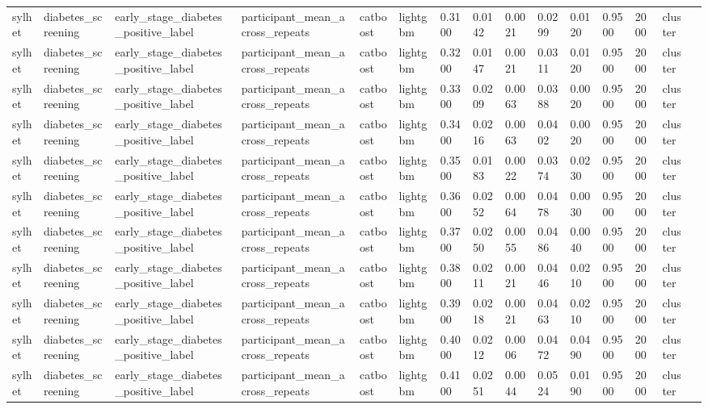 \begin{tabular}{lllllllllllllll}
sylhet & diabetes\_screening & early\_stage\_diabetes\_positive\_label & participant\_mean\_across\_repeats & catboost & lightgbm & 0.3100 & 0.0142 & 0.0021 & 0.0299 & 0.0120 & 0.9500 & 2000 & cluster &  \\
sylhet & diabetes\_screening & early\_stage\_diabetes\_positive\_label & participant\_mean\_across\_repeats & catboost & lightgbm & 0.3200 & 0.0147 & 0.0021 & 0.0311 & 0.0120 & 0.9500 & 2000 & cluster &  \\
sylhet & diabetes\_screening & early\_stage\_diabetes\_positive\_label & participant\_mean\_across\_repeats & catboost & lightgbm & 0.3300 & 0.0209 & 0.0063 & 0.0388 & 0.0020 & 0.9500 & 2000 & cluster &  \\
sylhet & diabetes\_screening & early\_stage\_diabetes\_positive\_label & participant\_mean\_across\_repeats & catboost & lightgbm & 0.3400 & 0.0216 & 0.0063 & 0.0402 & 0.0020 & 0.9500 & 2000 & cluster &  \\
sylhet & diabetes\_screening & early\_stage\_diabetes\_positive\_label & participant\_mean\_across\_repeats & catboost & lightgbm & 0.3500 & 0.0183 & 0.0022 & 0.0374 & 0.0230 & 0.9500 & 2000 & cluster &  \\
sylhet & diabetes\_screening & early\_stage\_diabetes\_positive\_label & participant\_mean\_across\_repeats & catboost & lightgbm & 0.3600 & 0.0252 & 0.0064 & 0.0478 & 0.0030 & 0.9500 & 2000 & cluster &  \\
sylhet & diabetes\_screening & early\_stage\_diabetes\_positive\_label & participant\_mean\_across\_repeats & catboost & lightgbm & 0.3700 & 0.0250 & 0.0055 & 0.0486 & 0.0040 & 0.9500 & 2000 & cluster &  \\
sylhet & diabetes\_screening & early\_stage\_diabetes\_positive\_label & participant\_mean\_across\_repeats & catboost & lightgbm & 0.3800 & 0.0211 & 0.0021 & 0.0446 & 0.0210 & 0.9500 & 2000 & cluster &  \\
sylhet & diabetes\_screening & early\_stage\_diabetes\_positive\_label & participant\_mean\_across\_repeats & catboost & lightgbm & 0.3900 & 0.0218 & 0.0021 & 0.0463 & 0.0210 & 0.9500 & 2000 & cluster &  \\
sylhet & diabetes\_screening & early\_stage\_diabetes\_positive\_label & participant\_mean\_across\_repeats & catboost & lightgbm & 0.4000 & 0.0212 & 0.0006 & 0.0472 & 0.0490 & 0.9500 & 2000 & cluster &  \\
sylhet & diabetes\_screening & early\_stage\_diabetes\_positive\_label & participant\_mean\_across\_repeats & catboost & lightgbm & 0.4100 & 0.0251 & 0.0044 & 0.0524 & 0.0190 & 0.9500 & 2000 & cluster &  \\

\end{tabular}
